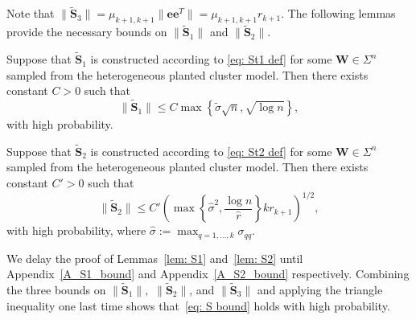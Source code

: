 \documentclass[twoside,11pt]{article}
\newcommand{\St}{\bs{\tilde S}}
\newcommand{\bs}{\boldsymbol}
\newcommand{\W}{\bs {W}}
\newcommand{\0}{\bs{0}}
\newcommand{\rbra}[1]{\ensuremath{\left( #1 \right)}} %
\newcommand{\bra}[1]{\ensuremath{\left\{ #1 \right\}}} %
\begin{document}
{Note that $\|\St_3\| = \mu_{k+1, k+1}\|\bs{e}\bs{e}^T\|=\mu_{k+1, k+1} r_{k+1}$.
The following lemmas provide the necessary bounds on $\|\St_1\|$ and $\|\St_2\|$.

\begin{lemma} \label{lem: S1}
	Suppose that \(\St_1\) is constructed according to \eqref{eq: St1 def}
	for some \(\W\in \Sigma^n\) sampled from the heterogeneous planted cluster model.
	Then there exists constant $C > 0$ such that
	\begin{equation} \label{eq: S1 bound}
	\|\St_1\| \le C   \max  \bra {\tilde \sigma\sqrt{n},  \sqrt{\log n}},
	\end{equation}
	with high probability.
\end{lemma}

\begin{lemma} \label{lem: S2}
	Suppose that \(\St_2\) is constructed according to \eqref{eq: St2 def}
	for some \(\W\in \Sigma^n\) sampled from the heterogeneous planted cluster model.
	Then there exists constant $C'> 0$ such that
	\begin{equation} \label{eq: S2 bound}
		\|\St_2 \| \le C' \rbra{ \max \bra{\hat\sigma^2, \frac{\log n}{\hat r} } k r_{k+1} }^{1/2},
	\end{equation}
	with high probability, where $\hat \sigma := \max_{q=1,\dots, k} \sigma_{qq}$.
\end{lemma}

We delay the proof of Lemmas~\ref{lem: S1} and~\ref{lem: S2} until Appendix~\ref{A_S1_bound}
and Appendix~\ref{A_S2_bound} respectively.
Combining the three bounds on \(\|\St_1\|,\) \(\|\St_2\|\), and \(\|\St_3\|\) and
applying the triangle inequality one last time shows that~\eqref{eq: S bound} holds
with high probability.


}
\end{document}
